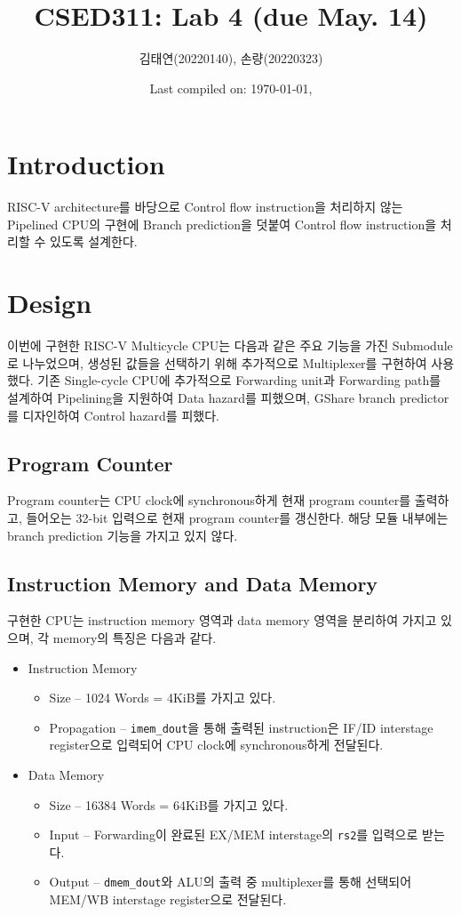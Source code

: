 \documentclass{scrartcl}
\title{CSED311: Lab 4 (due May. 14)}
\author{김태연(20220140), 손량(20220323)}
\date{Last compiled on: \today, \currenttime}
\begin{document}
\maketitle

\section{Introduction}
RISC-V architecture를 바당으로 Control flow instruction을 처리하지 않는 Pipelined CPU의 구현에 Branch prediction을 덧붙여
Control flow instruction을 처리할 수 있도록 설계한다.

\section{Design}
이번에 구현한 RISC-V Multicycle CPU는 다음과 같은 주요 기능을 가진 Submodule로 나누었으며, 생성된 값들을 선택하기 위해
추가적으로 Multiplexer를 구현하여 사용했다. 기존 Single-cycle CPU에 추가적으로 Forwarding unit과 Forwarding path를
설계하여 Pipelining을 지원하여 Data hazard를 피했으며, GShare branch predictor를 디자인하여 Control hazard를 피했다.

\subsection{Program Counter}
Program counter는 CPU clock에 synchronous하게 현재 program counter를 출력하고, 들어오는 32-bit 입력으로 현재 program counter를 갱신한다.
해당 모듈 내부에는 branch prediction 기능을 가지고 있지 않다.

\subsection{Instruction Memory and Data Memory}
구현한 CPU는 instruction memory 영역과 data memory 영역을 분리하여 가지고 있으며, 각 memory의 특징은 다음과 같다.

\begin{itemize}
  \item Instruction Memory
  \begin{itemize}
    \item Size -- 1024 Words = 4KiB를 가지고 있다.
    \item Propagation -- \texttt{imem\_dout}을 통해 출력된 instruction은 IF/ID interstage register으로 입력되어 CPU clock에 synchronous하게 전달된다.
  \end{itemize}
  \item Data Memory
  \begin{itemize}
    \item Size -- 16384 Words = 64KiB를 가지고 있다.
    \item Input -- Forwarding이 완료된 EX/MEM interstage의 \texttt{rs2}를 입력으로 받는다.
    \item Output -- \texttt{dmem\_dout}와 ALU의 출력 중 multiplexer를 통해 선택되어 MEM/WB interstage register으로 전달된다.
  \end{itemize}
\end{itemize}
\end{document}
